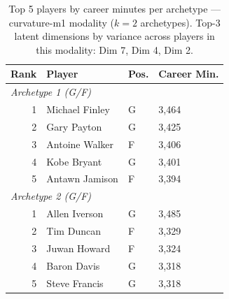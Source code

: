 \begin{table}[htbp]
  \centering\small
  \begin{tabular}{rlll}
    \toprule
    Rank & Player & Pos. & Career Min. \\
    \midrule
    \multicolumn{4}{l}{\textit{Archetype 1 (G/F)}} \\
    \midrule
    1 & Michael Finley & G & 3,464 \\
    2 & Gary Payton & G & 3,425 \\
    3 & Antoine Walker & F & 3,406 \\
    4 & Kobe Bryant & G & 3,401 \\
    5 & Antawn Jamison & F & 3,394 \\
    \midrule[0.4pt]
    \multicolumn{4}{l}{\textit{Archetype 2 (G/F)}} \\
    \midrule
    1 & Allen Iverson & G & 3,485 \\
    2 & Tim Duncan & F & 3,329 \\
    3 & Juwan Howard & F & 3,324 \\
    4 & Baron Davis & G & 3,318 \\
    5 & Steve Francis & G & 3,318 \\
    \bottomrule
  \end{tabular}
  \caption{Top 5 players by career minutes per archetype --- curvature-m1 modality ($k=2$ archetypes). Top-3 latent dimensions by variance across players in this modality: Dim 7, Dim 4, Dim 2.}
  \label{tab:arch_reps_curvature_m1}
\end{table}

